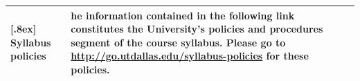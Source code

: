 \documentclass[10pt]{article}
\begin{document}
\begin{center}
\begin{tabular}{|p{} p{}|}
[.8ex] \textbf{Syllabus policies} & he information contained in the following link constitutes the University's policies and procedures segment of the course syllabus. Please go to \url{http://go.utdallas.edu/syllabus-policies} for these policies.\\
\hline
\end{tabular}
\end{center}
\end{document}
